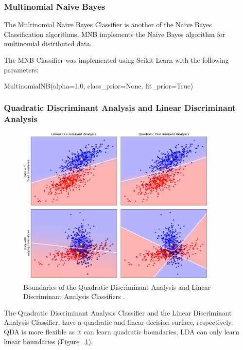 \subsubsection*{Multinomial Naive Bayes}

The Multinomial Naive Bayes Classifier is another of the Naive Bayes Classification algorithms. MNB implements the Naive Bayes algorithm for multinomial distributed data.

The MNB Classifier was implemented using Scikit Learn with the following parameters:

\begin{tcolorbox}
\begin{center}
	MultinomialNB(alpha=1.0, class\_prior=None, fit\_prior=True)
\end{center}
\end{tcolorbox}

\subsubsection*{Quadratic Discriminant Analysis and Linear Discriminant Analysis}

\begin{figure}[h!]
\centering
\includegraphics[width=0.9\textwidth]{design_and_methodology/qda_and_lda.png}
\caption{\label{fig:qdalda} Boundaries of the Quadratic Discriminant Analysis and Linear Discriminant Analysis Classifiers \cite{scikit-learn}.}
\end{figure}

The Quadratic Discriminant Analysis Classifier and the Linear Discriminant Analysis Classifier, have a quadratic and linear decision surface, respectively. QDA is more flexible as it can learn quadratic boundaries, LDA can only learn linear boundaries (Figure ~\ref{fig:qdalda}). 

